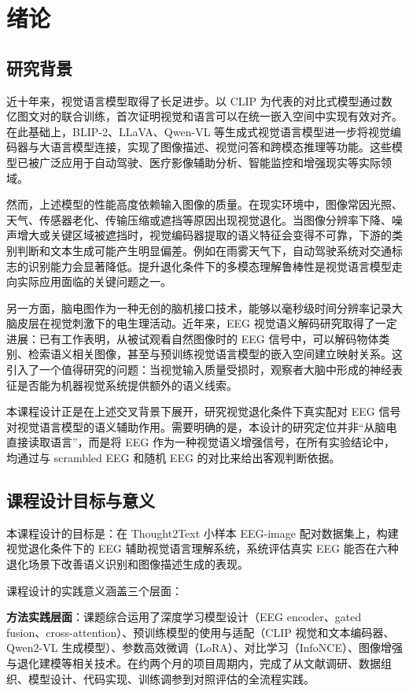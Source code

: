 \section{绪论}

\subsection{研究背景}

近十年来，视觉语言模型取得了长足进步。以 CLIP 为代表的对比式模型通过数亿图文对的联合训练，首次证明视觉和语言可以在统一嵌入空间中实现有效对齐。在此基础上，BLIP-2、LLaVA、Qwen-VL 等生成式视觉语言模型进一步将视觉编码器与大语言模型连接，实现了图像描述、视觉问答和跨模态推理等功能。这些模型已被广泛应用于自动驾驶、医疗影像辅助分析、智能监控和增强现实等实际领域。

然而，上述模型的性能高度依赖输入图像的质量。在现实环境中，图像常因光照、天气、传感器老化、传输压缩或遮挡等原因出现视觉退化。当图像分辨率下降、噪声增大或关键区域被遮挡时，视觉编码器提取的语义特征会变得不可靠，下游的类别判断和文本生成可能产生明显偏差。例如在雨雾天气下，自动驾驶系统对交通标志的识别能力会显著降低。提升退化条件下的多模态理解鲁棒性是视觉语言模型走向实际应用面临的关键问题之一。

另一方面，脑电图作为一种无创的脑机接口技术，能够以毫秒级时间分辨率记录大脑皮层在视觉刺激下的电生理活动。近年来，EEG 视觉语义解码研究取得了一定进展：已有工作表明，从被试观看自然图像时的 EEG 信号中，可以解码物体类别、检索语义相关图像，甚至与预训练视觉语言模型的嵌入空间建立映射关系。这引入了一个值得研究的问题：当视觉输入质量受损时，观察者大脑中形成的神经表征是否能为机器视觉系统提供额外的语义线索。

本课程设计正是在上述交叉背景下展开，研究视觉退化条件下真实配对 EEG 信号对视觉语言模型的语义辅助作用。需要明确的是，本设计的研究定位并非``从脑电直接读取语言''，而是将 EEG 作为一种视觉语义增强信号，在所有实验结论中，均通过与 scrambled EEG 和随机 EEG 的对比来给出客观判断依据。

\subsection{课程设计目标与意义}

本课程设计的目标是：在 Thought2Text 小样本 EEG-image 配对数据集上，构建视觉退化条件下的 EEG 辅助视觉语言理解系统，系统评估真实 EEG 能否在六种退化场景下改善语义识别和图像描述生成的表现。

课程设计的实践意义涵盖三个层面：

\textbf{方法实践层面}：课题综合运用了深度学习模型设计（EEG encoder、gated fusion、cross-attention）、预训练模型的使用与适配（CLIP 视觉和文本编码器、Qwen2-VL 生成模型）、参数高效微调（LoRA）、对比学习（InfoNCE）、图像增强与退化建模等相关技术。在约两个月的项目周期内，完成了从文献调研、数据组织、模型设计、代码实现、训练调参到对照评估的全流程实践。

